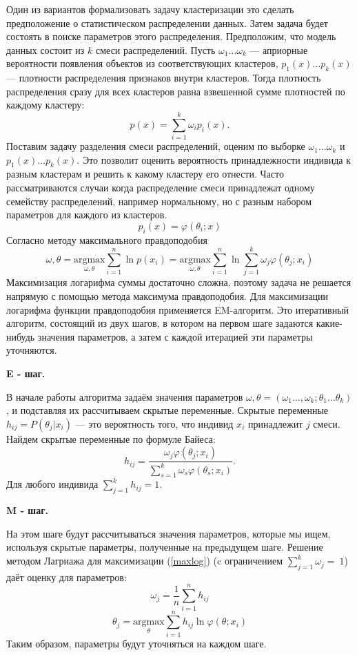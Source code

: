 \documentclass[10pt]{article}
\begin{document}
Один из вариантов формализовать задачу кластеризации это сделать предположение о статистическом распределении данных. Затем задача будет состоять в поиске параметров этого распределения. Предположим, что модель данных состоит из $k$ смеси распределений. Пусть $\omega_{1}\ldots \omega_{k}$ --- априорные вероятности появления объектов из соответствующих кластеров, $p_{1}(x)\ldots p_{k}(x)$ --- плотности распределения признаков внутри кластеров. Тогда плотность распределения сразу для всех кластеров равна взвешенной сумме плотностей по каждому кластеру:
$$
p(x) = \sum\limits_{i=1}^k \omega_{i} p_{i}(x).
$$
Поставим задачу разделения смеси распределений, оценим по выборке $\omega_{1}\ldots \omega_{k}$ и $p_{1}(x)\ldots p_{k}(x)$. Это позволит оценить вероятность принадлежности индивида к разным кластерам и решить к какому кластеру его отнести. Часто рассматриваются случаи когда распределение смеси принадлежат одному семейству распределений, например нормальному, но с разным набором параметров для каждого из кластеров. 
$$
p_{i}(x) = \varphi(\theta_{i}; x)
$$
Согласно методу максимального правдоподобия 
$$
\omega, \theta = \underset{\omega, \theta}{\text{argmax}} \sum\limits_{i=1}^n \ln{p(x_{i})}  =  \underset{\omega, \theta}{\text{argmax}} \sum\limits_{i=1}^n \ln  \sum\limits_{j=1}^k \omega_{j}  \varphi(\theta_{j}; x_{i})
$$
Максимизация логарифма суммы достаточно сложна, поэтому задача не решается напрямую с помощью метода максимума правдоподобия. Для максимизации логарифма функции правдоподобия применяется EM-алгоритм. Это итеративный алгоритм, состоящий из двух шагов, в котором на первом шаге задаются какие-нибудь значения параметров, а затем с каждой итерацией эти параметры уточняются.

\textbf{E - шаг.}

В начале работы алгоритма задаём значения параметров $\omega, \theta = (\omega_{1}\ldots, \omega_{k};\theta_{1}\ldots \theta_{k})$, и подставляя их рассчитываем скрытые переменные. Скрытые переменные $h_{ij} = P(\theta_{j}|x_{i})$ --- это вероятность того, что индивид $x_{i}$ принадлежит $j$ смеси. Найдем скрытые переменные по формуле Байеса:
$$
h_{ij} = \frac{ \omega_{j} \varphi(\theta_{j}; x_{i})}{\sum\limits_{s=1}^k \omega_{s}  \varphi(\theta_{s}; x_{i})}.
$$
Для любого индивида $\sum\limits_{j=1}^k h_{ij} = 1.$

\textbf{M - шаг.}

На этом шаге будут рассчитываться значения параметров, которые мы ищем, используя скрытые параметры, полученные на предыдущем шаге. Решение методом Лагрнажа для максимизации (\ref{maxlog}) (c ограничением $\sum\limits_{j=1}^k\omega_{j}=~1$) даёт оценку для параметров:
$$
\omega_{j} = \frac{1}{n} \sum\limits_{i=1}^n h_{ij}
$$
$$
\theta_{j} = \underset{\theta}{\text{argmax}} \sum\limits_{i=1}^n h_{ij} \ln{\varphi(\theta; x_{i})}
$$
Таким образом, параметры будут уточняться на каждом шаге.
\end{document}
